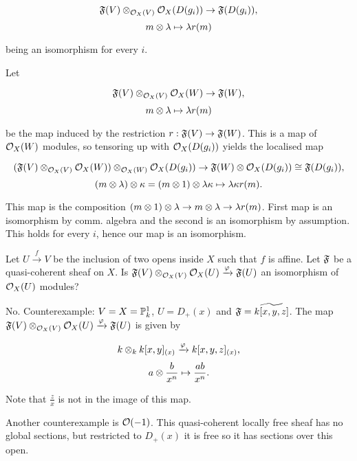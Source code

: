 \begin{Qanswer}
\[\shf(V)\tensor_{\O_X(V)} \O_X(D(g_i)) \rightarrow \shf(D(g_i)),\]
\[m \tensor \lambda \to \lambda r(m)\]

being an isomorphism for every $i$.

Let 

\[\shf(V)\tensor_{\O_X(V)} \O_X(W) \rightarrow \shf(W),\]
\[m \tensor \lambda \to \lambda r(m)\]

be the map induced by the restriction $r:\shf(V) \rightarrow \shf(W)$.
This is a map of $\O_X(W)$ modules, so tensoring up with $\O_X(D(g_i))$ yields the localised map

\[(\shf(V)\tensor_{\O_X(V)}  \O_X(W)) \tensor_{\O_X(W)} \O_X(D(g_i)) \rightarrow \shf(W) \tensor \O_X(D(g_i)) \iso \shf(D(g_i)),\]
\[(m \tensor \lambda)\tensor \kappa = (m\tensor 1) \tensor \lambda \kappa \to \lambda \kappa r(m).\]

This map is the composition  $(m\tensor 1) \tensor \lambda \rightarrow m\tensor \lambda \rightarrow \lambda r(m)$.
First map is an isomorphism by comm. algebra and the second is an isomorphism by assumption.
This holds for every $i$, hence our map is an isomorphism.

\end{Qanswer}

\bigskip

\begin{question}
Let $U \xrightarrow{f}  V$ be the inclusion of two opens inside $X$ such that $f$ is affine.
Let $\shf$ be a quasi-coherent sheaf on $X$. 
Is $\shf(V)\tensor_{\O_X(V)} \O_X(U) \xrightarrow{\varphi} \shf(U)$ an isomorphism of $\O_X(U)$ modules?
\end{question}


\begin{Qanswer}
No. Counterexample:  $V = X = \P_k^1$, $U=D_+(x)$ and $\shf = \widetilde{k[x,y,z]}$.
The map $\shf(V)\tensor_{\O_X(V)} \O_X(U) \xrightarrow{\varphi} \shf(U)$ is given by

\[k \tensor_{k} k[x,y]_{(x)} \xrightarrow{\varphi} k[x,y,z]_{(x)},\]
\[ a\tensor \frac{b}{x^n} \mapsto \frac{ab}{x^n}.\]

Note that $\frac{z}{x}$ is not in the image of this map.

Another counterexample is $\O(-1)$. This quasi-coherent locally free sheaf has no global sections, but restricted to $D_+(x)$ it is free so it has sections over this open.

\end{Qanswer}

